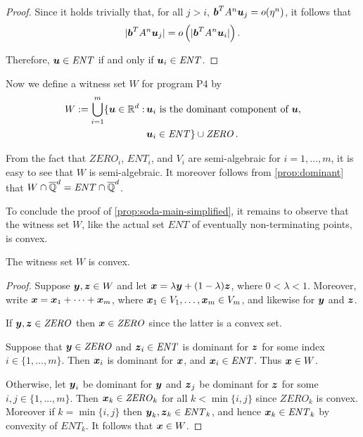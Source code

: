 \begin{proof}
Since it holds trivially that, for all $j>i$, $\boldsymbol{b}^{T} A^{n} \boldsymbol{u}_{j} = o(\eta^{n})$, it follows that
\begin{equation*}
  \lvert \boldsymbol{b}^T A^{n}\boldsymbol{u}_{j} \rvert = o\left(\lvert\boldsymbol{b}^{T} A^{n}
  \boldsymbol{u}_{i} \rvert\right).
\end{equation*}

Therefore, $\boldsymbol{u} \in \mathit{ENT}$ if and only if $\boldsymbol{u}_{i} \in \mathit{ENT}$.
\end{proof}

Now we define a witness set $W$ for program \textsf{P4} by
\begin{align*}
W :=   \bigcup_{i=1}^m \lbrace \boldsymbol{u}\in \mathbb{R}^{d}: \,
         & \boldsymbol{u}_i \mbox{ is the dominant component of } \boldsymbol{u},\\
         & \boldsymbol{u}_i \in \mathit{ENT} \rbrace
\cup \mathit{ZERO} \, .
\end{align*}

From the fact that $\mathit{ZERO}_i$, $\mathit{ENT}_i$, and $V_i$ are
semi-algebraic for $i=1,\ldots,m$, it is easy to see that $W$ is
semi-algebraic.  It moreover follows from \cref{prop:dominant}
that $W \cap \overline{\mathbb{Q}}^{d} = \mathit{ENT} \cap \overline{\mathbb{Q}}^{d}$.

To conclude the proof of \cref{prop:soda-main-simplified}, it
remains to observe that the witness set $W$, like the actual set
$\mathit{ENT}$ of eventually non-terminating points, is convex.
\begin{proposition}
The witness set $W$ is convex.
\end{proposition}
\begin{proof}
  Suppose $\boldsymbol y,\boldsymbol z\in W$ and let $\boldsymbol
  x=\lambda\boldsymbol y+(1-\lambda)\boldsymbol z$, where $0 < \lambda
  < 1$. Moreover, write
  $\boldsymbol{x}=\boldsymbol{x}_1+\cdots+\boldsymbol{x}_m$, where
  $\boldsymbol{x}_1\in V_1,\ldots,\boldsymbol{x}_m\in V_m$, and
  likewise for $\boldsymbol{y}$ and $\boldsymbol{z}$.

If $\boldsymbol{y},\boldsymbol{z}\in \mathit{ZERO}$ then
$\boldsymbol{x}\in \mathit{ZERO}$ since the latter is a convex set.

Suppose that $\boldsymbol{y}\in \mathit{ZERO}$ and $\boldsymbol{z}_i \in \mathit{ENT}$ is dominant for $\boldsymbol{z}$ for some index $i\in\lbrace 1,\ldots,m\rbrace$.
Then $\boldsymbol{x}_i$ is dominant for $\boldsymbol{x}$, and
$\boldsymbol{x}_i \in \mathit{ENT}$.  Thus $\boldsymbol{x}\in W$.

Otherwise, let $\boldsymbol y_i$ be dominant for $\boldsymbol y$ and
$\boldsymbol z_j$ be dominant for $\boldsymbol z$ for some
$i,j\in\lbrace 1,\ldots,m\rbrace$.  Then $\boldsymbol x_k\in \mathit{ZERO}_k$ for
all $k<\min\lbrace i,j\rbrace$ since $\mathit{ZERO}_k$ is convex.
Moreover if $k=\min\lbrace i,j\rbrace$ then $\boldsymbol
y_k,\boldsymbol z_k \in \mathit{ENT}_k$, and hence $\boldsymbol x_k
\in \mathit{ENT}_k$ by convexity of $\mathit{ENT}_k$.  It follows that
$\boldsymbol{x}\in W$.
\end{proof}

